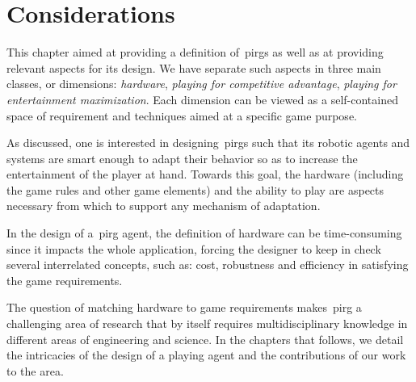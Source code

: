 \section{Considerations}
This chapter aimed at providing a definition of~\glspl{pirg} as well as at providing relevant aspects for its design. We have separate such aspects in three main classes, or dimensions: \textit{hardware}, \textit{playing for competitive advantage}, \textit{playing for entertainment maximization}. Each dimension can be viewed as a self-contained space of requirement and techniques aimed at a specific game purpose.

As discussed, one is interested in designing~\glspl{pirg} such that its robotic agents and systems are smart enough to adapt their behavior so as to increase the entertainment of the player at hand. Towards this goal, the hardware (including the game rules and other game elements) and the ability to play are aspects necessary from which to support any mechanism of adaptation. 

In the design of a~\gls{pirg} agent, the definition of hardware can be time-consuming since it impacts the whole application, forcing the designer to keep in check several interrelated concepts, such as: cost, robustness and efficiency in satisfying the game requirements. 

The question of matching hardware to game requirements makes~\gls{pirg} a challenging area of research that by itself requires multidisciplinary knowledge in different areas of engineering and science. In the chapters that follows, we detail the intricacies of the design of a playing agent and the contributions of our work to the area.